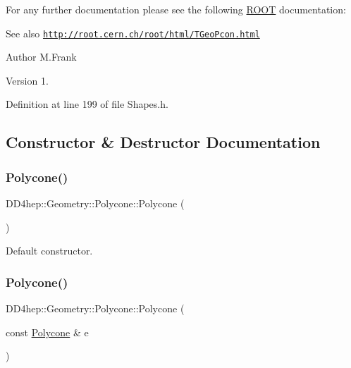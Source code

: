 For any further documentation please see the following \hyperlink{namespace_r_o_o_t}{R\+O\+OT} documentation\+: \begin{DoxySeeAlso}{See also}
\href{http://root.cern.ch/root/html/TGeoPcon.html}{\tt http\+://root.\+cern.\+ch/root/html/\+T\+Geo\+Pcon.\+html}
\end{DoxySeeAlso}
\begin{DoxyAuthor}{Author}
M.\+Frank 
\end{DoxyAuthor}
\begin{DoxyVersion}{Version}
1. 
\end{DoxyVersion}


Definition at line 199 of file Shapes.\+h.



\subsection{Constructor \& Destructor Documentation}
\hypertarget{class_d_d4hep_1_1_geometry_1_1_polycone_a388e0ce73b138c4c50225e625d9cf968}{}\label{class_d_d4hep_1_1_geometry_1_1_polycone_a388e0ce73b138c4c50225e625d9cf968} 
\subsubsection{\texorpdfstring{Polycone()}{Polycone()}\hspace{0.1cm}{\footnotesize\ttfamily [1/6]}}
{\footnotesize\ttfamily D\+D4hep\+::\+Geometry\+::\+Polycone\+::\+Polycone (\begin{DoxyParamCaption}{ }\end{DoxyParamCaption})\hspace{0.3cm}{\ttfamily [default]}}



Default constructor. 

\hypertarget{class_d_d4hep_1_1_geometry_1_1_polycone_a92909385cdc93e861ae3b025fa6fb712}{}\label{class_d_d4hep_1_1_geometry_1_1_polycone_a92909385cdc93e861ae3b025fa6fb712} 
\subsubsection{\texorpdfstring{Polycone()}{Polycone()}\hspace{0.1cm}{\footnotesize\ttfamily [2/6]}}
{\footnotesize\ttfamily D\+D4hep\+::\+Geometry\+::\+Polycone\+::\+Polycone (\begin{DoxyParamCaption}\item[{const \hyperlink{class_d_d4hep_1_1_geometry_1_1_polycone}{Polycone} \&}]{e }\end{DoxyParamCaption})\hspace{0.3cm}{\ttfamily [default]}}



